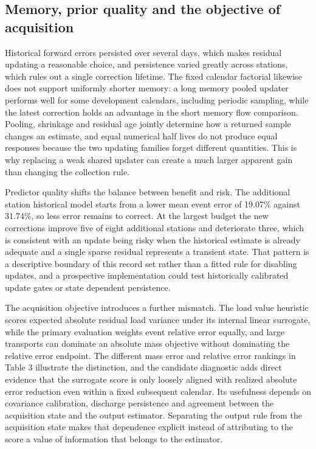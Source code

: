 \documentclass[pdflatex,sn-mathphys-num]{sn-jnl}%
\theoremstyle{thmstyleone}%
\theoremstyle{thmstyletwo}%
\theoremstyle{thmstylethree}%
\begin{document}
\subsection{Memory, prior quality and the objective of acquisition}

Historical forward errors persisted over several days, which makes residual updating a reasonable choice, and persistence varied greatly across stations, which rules out a single correction lifetime. The fixed calendar factorial likewise does not support uniformly shorter memory: a long memory pooled updater performs well for some development calendars, including periodic sampling, while the latest correction holds an advantage in the short memory flow comparison. Pooling, shrinkage and residual age jointly determine how a returned sample changes an estimate, and equal numerical half lives do not produce equal responses because the two updating families forget different quantities. This is why replacing a weak shared updater can create a much larger apparent gain than changing the collection rule.

Predictor quality shifts the balance between benefit and risk. The additional station historical model starts from a lower mean event error of 19.07\% against 31.74\%, so less error remains to correct. At the largest budget the new corrections improve five of eight additional stations and deteriorate three, which is consistent with an update being risky when the historical estimate is already adequate and a single sparse residual represents a transient state. That pattern is a descriptive boundary of this record set rather than a fitted rule for disabling updates, and a prospective implementation could test historically calibrated update gates or state dependent persistence.

The acquisition objective introduces a further mismatch. The load value heuristic scores expected absolute residual load variance under its internal linear surrogate, while the primary evaluation weights event relative error equally, and large transports can dominate an absolute mass objective without dominating the relative error endpoint. The different mass error and relative error rankings in Table 3 illustrate the distinction, and the candidate diagnostic adds direct evidence that the surrogate score is only loosely aligned with realized absolute error reduction even within a fixed subsequent calendar. Its usefulness depends on covariance calibration, discharge persistence and agreement between the acquisition state and the output estimator. Separating the output rule from the acquisition state makes that dependence explicit instead of attributing to the score a value of information that belongs to the estimator.
\end{document}
